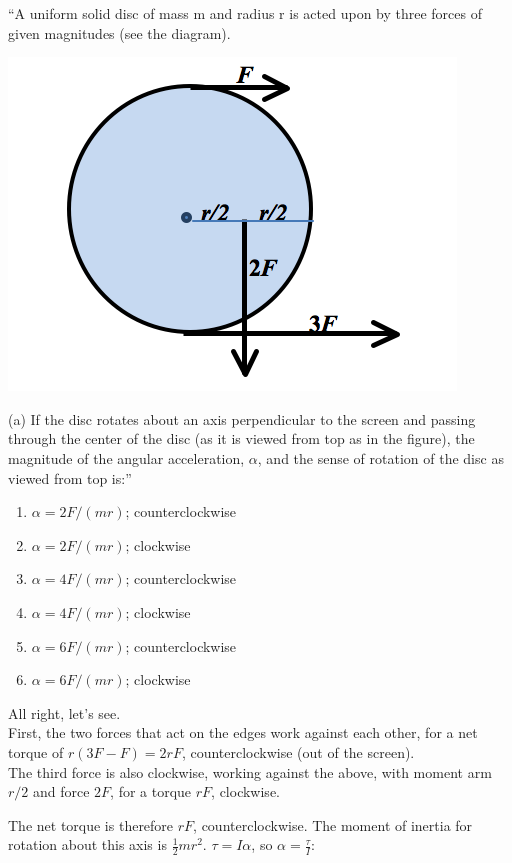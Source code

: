 \documentclass[8.01x]{subfiles}
\begin{document}
``A uniform solid disc of mass m and radius r is acted upon by three forces of given magnitudes (see the diagram).

\begin{center}
\includegraphics[scale=0.65]{Graphics/midterm3p2}
\end{center}

(a) If the disc rotates about an axis perpendicular to the screen and passing through the center of the disc (as it is viewed from top as in the figure), the magnitude of the angular acceleration, $\alpha$, and the sense of rotation of the disc as viewed from top is:''

\begin{enumerate}
\item $\alpha=2F/(mr)$; counterclockwise
\item $\alpha=2F/(mr)$; clockwise
\item $\alpha=4F/(mr)$; counterclockwise
\item $\alpha=4F/(mr)$; clockwise
\item $\alpha=6F/(mr)$; counterclockwise
\item $\alpha=6F/(mr)$; clockwise
\end{enumerate}

All right, let's see.\\
First, the two forces that act on the edges work against each other, for a net torque of $r(3F - F) = 2 r F$, counterclockwise (out of the screen).\\
The third force is also clockwise, working against the above, with moment arm $r/2$ and force $2F$, for a torque $r F$, clockwise.

The net torque is therefore $r F$, counterclockwise. The moment of inertia for rotation about this axis is $\displaystyle \frac{1}{2} m r^2$. $\tau = I \alpha$, so $\displaystyle \alpha = \frac{\tau}{I}$:
\end{document}
